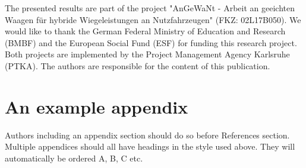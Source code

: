\documentclass[3p,times,procedia]{elsarticle}
\begin{document}
The presented results are part of the project "AnGeWaNt - Arbeit an geeichten Waagen für hybride Wiegeleistungen an Nutzfahrzeugen" (FKZ: 02L17B050). We would like to thank the German Federal Ministry of Education and Research (BMBF) and the European Social Fund (ESF) for funding this research project. Both projects are implemented by the Project Management Agency Karlsruhe (PTKA). The authors are responsible for the content of this publication.



\appendix
\section{An example appendix}
Authors including an appendix section should do so before References section. Multiple appendices should all have headings in the style used above. They will automatically be ordered A, B, C etc.





 
\end{document}
